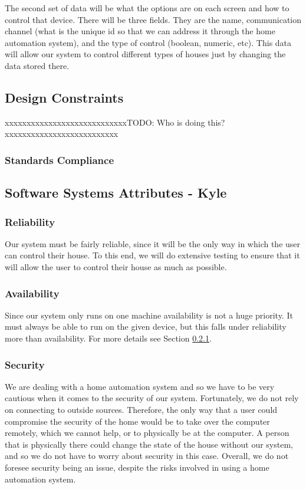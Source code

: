 \documentclass{article}
\begin{document}
The second set of data will be what the options are on each screen and how to control that device. There will be three fields. They are the name, communication channel (what is the unique id so that we can address it through the home automation system), and the type of control (boolean, numeric, etc). This data will allow our system to control different types of houses just by changing the data stored there.

\subsection{Design Constraints}
{\color{red}xxxxxxxxxxxxxxxxxxxxxxxxxxxxTODO: Who is doing this?xxxxxxxxxxxxxxxxxxxxxxxxxx}

\subsubsection{Standards Compliance}

\subsection{Software Systems Attributes - Kyle}

\subsubsection{Reliability} \label{sec:reliability}
Our system must be fairly reliable, since it will be the only way in which the user can control their house. To this end, we will do extensive testing to ensure that it will allow the user to control their house as much as possible.

\subsubsection{Availability}
Since our system only runs on one machine availability is not a huge priority. It must always be able to run on the given device, but this falls under reliability more than availability. For more details see Section \ref{sec:reliability}.

\subsubsection{Security}
We are dealing with a home automation system and so we have to be very cautious when it comes to the security of our system. Fortunately, we do not rely on connecting to outside sources. Therefore, the only way that a user could compromise the security of the home would be to take over the computer remotely, which we cannot help, or to physically be at the computer. A person that is physically there could change the state of the house without our system, and so we do not have to worry about security in this case. Overall, we do not foresee security being an issue, despite the risks involved in using a home automation system.
\end{document}
